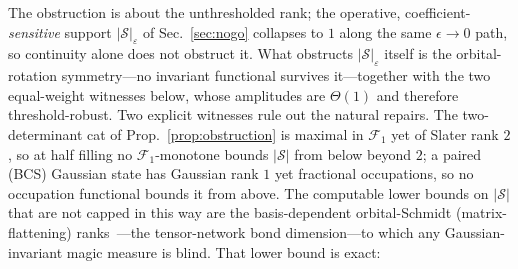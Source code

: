 \noindent The obstruction is about the unthresholded rank; the operative, coefficient-\emph{sensitive}
support $|\mathcal S|_\varepsilon$ of Sec.~\ref{sec:nogo} collapses to $1$ along the same
$\epsilon\to0$ path, so continuity alone does not obstruct it. What obstructs $|\mathcal S|_\varepsilon$
itself is the orbital-rotation symmetry---no invariant functional survives it---together with the two
equal-weight witnesses below, whose amplitudes are $\Theta(1)$ and therefore threshold-robust.
Two explicit witnesses rule out the natural repairs. The two-determinant cat of
Prop.~\ref{prop:obstruction} is maximal in $\mathcal F_1$ yet of Slater rank $2$, so at half filling no
$\mathcal F_1$-monotone bounds $|\mathcal S|$ from below beyond $2$; a paired (BCS) Gaussian state has
Gaussian rank $1$ yet fractional occupations, so no occupation functional bounds it from above. The
computable lower bounds on $|\mathcal S|$ that are not capped in this way are the basis-dependent
orbital-Schmidt (matrix-flattening) ranks~\cite{schollwock2011}---the tensor-network bond
dimension---to which any Gaussian-invariant magic measure is blind. That lower bound is exact:

